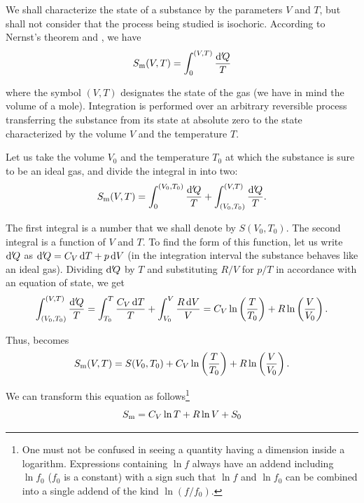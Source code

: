 We shall characterize the state of a substance by the parameters $V$ and $T$, but shall not consider that the process being studied is isochoric. According to Nernst's theorem and , we have
\begin{equation}\label{eq:12_33}
	S_{\text{m}}(V,T) = \int_{0}^{(V,T)} \frac{\mathrm{d}'\!Q}{T}
\end{equation}

\noindent
where the symbol $(V, T)$ designates the state of the gas (we have in mind the volume of a mole). Integration is performed over an arbitrary reversible process transferring the substance from its state at absolute zero to the state characterized by the volume $V$ and the temperature $T$.

Let us take the volume $V_0$ and the temperature $T_0$ at which the substance is sure to be an ideal gas, and divide the integral in  into two:
\begin{equation}\label{eq:12_34}
	S_{\text{m}}(V,T) = \int_{0}^{(V_0,T_0)} \frac{\mathrm{d}'\!Q}{T} + \int_{(V_0,T_0)}^{(V,T)} \frac{\mathrm{d}'\!Q}{T}.
\end{equation}

\noindent
The first integral is a number that we shall denote by $S(V_0,T_0)$. The second integral is a function of $V$ and $T$. To find the form of this function, let us write $\mathrm{d}'\!Q$ as $\mathrm{d}'\!Q=C_V\,\mathrm{d} T+p\,\mathrm{d} V$ (in the integration interval the substance behaves like an ideal gas). Dividing $\mathrm{d}'\!Q$ by $T$ and substituting $R/V$ for $p/T$ in accordance with an equation of state, we get
\begin{equation*}
	\int_{(V_0,T_0)}^{(V,T)} \frac{\mathrm{d}'\!Q}{T} = \int_{T_0}^{T} \frac{C_V\,\mathrm{d} T}{T} + \int_{V_0}^{V} \frac{R\,\mathrm{d} V}{V} = C_V\ln\left(\frac{T}{T_0}\right) + R\ln\left(\frac{V}{V_0}\right).
\end{equation*}

\noindent
Thus,  becomes
\begin{equation}\label{eq:12_35}
	S_{\text{m}}(V,T) = S(V_0,T_0) + C_V\ln\left(\frac{T}{T_0}\right) + R\ln\left(\frac{V}{V_0}\right).
\end{equation}

\noindent
We can transform this equation as follows\footnote{One must not be confused in seeing a quantity having a dimension inside a logarithm. Expressions containing $\ln{f}$ always have an addend including $\ln{f_0}$ ($f_0$ is a constant) with a sign such that $\ln{f}$ and $\ln{f_0}$ can be combined into a single addend of the kind $\ln(f/f_0)$.}
\begin{equation}\label{eq:12_36}
	S_{\text{m}} = C_V\ln{T} + R\ln{V} + S_0
\end{equation}

